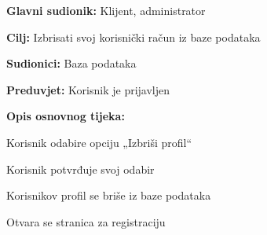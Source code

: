 						\noindent {}
						\begin{packed_item}
							
							\item \textbf{Glavni sudionik: }Klijent, administrator
							\item  \textbf{Cilj:} Izbrisati svoj korisnički račun iz baze podataka
							\item  \textbf{Sudionici:} Baza podataka
							\item  \textbf{Preduvjet:} Korisnik je prijavljen
							\item  \textbf{Opis osnovnog tijeka:}
							
							\item[] \begin{packed_enum}
								
								\item Korisnik odabire opciju „Izbriši profil“
								\item Korisnik potvrđuje svoj odabir
								\item Korisnikov profil se briše iz baze podataka
								\item Otvara se stranica za registraciju
								
							\end{packed_enum}
							
						\end{packed_item}
						

